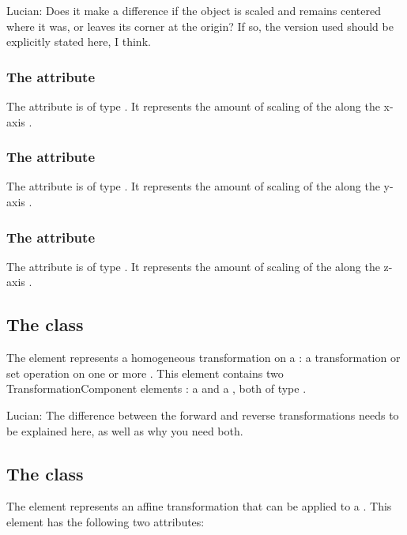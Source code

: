 {\color{red} Lucian: \notice Does it make a difference if the object is scaled and remains centered where it was, or leaves its corner at the origin?  If so, the version used should be explicitly stated here, I think.}

\subsubsection{The  attribute}
The  attribute is of type . It represents the amount of scaling of the \CSGNode along the x-axis .

\subsubsection{The  attribute}
The  attribute is of type . It represents the amount of scaling of the \CSGNode along the y-axis .

\subsubsection{The  attribute}
The  attribute is of type . It represents the amount of scaling of the \CSGNode along the z-axis .

\subsection{The  class}
\label{CSGHomogeneousTransformation-class}
The \CSGHomogeneousTransformation element represents a homogeneous transformation on a \CSGNode: a transformation or set operation on one or more \CSGPrimitives. This element contains two TransformationComponent elements : a  and a , both of type \TransformationComponent.

{\color{red} Lucian: \notice The difference between the forward and reverse transformations needs to be explained here, as well as why you need both.}


\subsection{The  class}
\label{TransformationComponent-class}
The \TransformationComponent element represents an affine transformation that can be applied to a \CSGNode. This element has the following two attributes:

